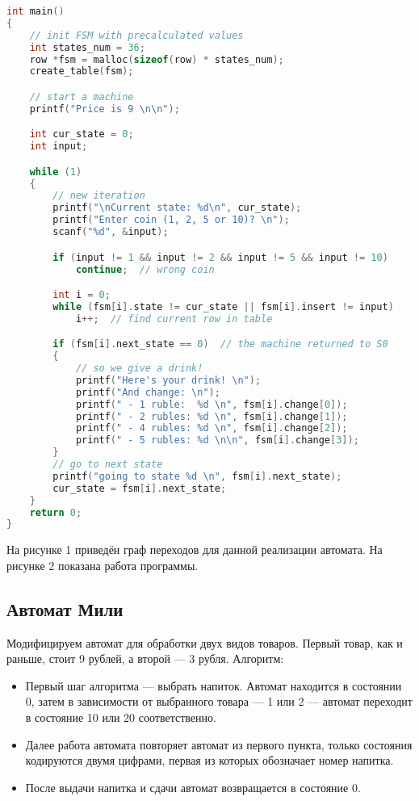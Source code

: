 \begin{lstlisting}[language=c, caption={Реализация первого конечного автомата}]
int main()
{
    // init FSM with precalculated values
    int states_num = 36;
    row *fsm = malloc(sizeof(row) * states_num);
    create_table(fsm);

    // start a machine
    printf("Price is 9 \n\n");

    int cur_state = 0;
    int input;

    while (1)
    {
        // new iteration
        printf("\nCurrent state: %d\n", cur_state);
        printf("Enter coin (1, 2, 5 or 10)? \n");
        scanf("%d", &input);

        if (input != 1 && input != 2 && input != 5 && input != 10)
            continue;  // wrong coin

        int i = 0;
        while (fsm[i].state != cur_state || fsm[i].insert != input)
            i++;  // find current row in table

        if (fsm[i].next_state == 0)  // the machine returned to S0
        {
            // so we give a drink!
            printf("Here's your drink! \n");
            printf("And change: \n");
            printf(" - 1 ruble:  %d \n", fsm[i].change[0]);
            printf(" - 2 rubles: %d \n", fsm[i].change[1]);
            printf(" - 4 rubles: %d \n", fsm[i].change[2]);
            printf(" - 5 rubles: %d \n\n", fsm[i].change[3]);
        }
        // go to next state
        printf("going to state %d \n", fsm[i].next_state);
        cur_state = fsm[i].next_state;
    }
    return 0;
}
\end{lstlisting}

На рисунке 1 приведён граф переходов для данной реализации автомата. На рисунке 2 показана работа программы.

\FloatBarrier

\FloatBarrier


\subsection{Автомат Мили}
Модифицируем автомат для обработки двух видов товаров. Первый товар, как и раньше, стоит 9 рублей, а второй — 3 рубля.
Алгоритм:
\begin{itemize}
    \item Первый шаг алгоритма — выбрать напиток. Автомат находится в состоянии 0, затем в зависимости от выбранного товара — 1 или 2 — автомат переходит в состояние 10 или 20 соответственно.
    \item Далее работа автомата повторяет автомат из первого пункта, только состояния кодируются двумя цифрами, первая из которых обозначает номер напитка.
    \item После выдачи напитка и сдачи автомат возвращается в состояние 0.
\end{itemize}


